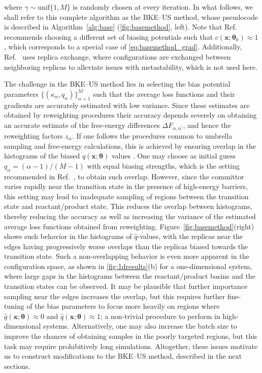 \documentclass{article}
\numberwithin{equation}{section}
\def\*#1{\mathbf{#1}}
\theoremstyle{definition}
\theoremstyle{remark}
\def\thetab{\boldsymbol{\theta}}
\begin{document}
where $\gamma \sim \mathrm{unif}\{1,M\}$ is randomly chosen at every iteration. 
In what follows, we shall refer to this complete algorithm as the BKE--US method, whose pseudocode is described in Algorithm~\ref{alg:base} (\cref{fig:basemethod}, left).
Note that Ref.~\cite{rotskoff2020learning} recommends choosing a different set of biasing potentials such that $ c ( \* x ; \thetab_{k} ) \approx 1 $, which corresponds to a special case of \cref{eq:basemethod_grad}. Additionally, Ref.~\cite{rotskoff2020learning} uses replica exchange, where configurations are exchanged between neighboring replicas to alleviate issues with metastability, which is not used here.

The challenge in the BKE--US method lies in selecting the bias potential parameters $\{ (\kappa_\alpha, q_\alpha) \}_{\alpha=1}^M$ such that the average loss functions and their gradients are  accurately estimated with low variance. 
Since these estimates are obtained by reweighting procedures their accuracy depends severely on obtaining an accurate estimate of the free-energy differences $ \Delta F_{\alpha, \alpha^\prime} $, and hence the reweighting factors $ z_{\alpha} $.
If one follows the procedures common to umbrella sampling and free-energy calculations, this is achieved by ensuring overlap in the histograms of the biased $\hat{q}(\* x; \thetab)$ values \cite{pohorille2010good}. 
One may choose as initial guess $q_\alpha = (\alpha - 1)/(M-1) $ with equal biasing strengths, which is the setting recommended in Ref.~\cite{rotskoff2020learning}, to obtain such overlap. However, since the committor varies rapidly near the transition state in the presence of high-energy barriers, this setting may lead to inadequate sampling of regions between the transition state and reactant/product state. 
This reduces the overlap between histograms, thereby reducing the accuracy as well as increasing the variance of the estimated average loss functions obtained from reweighting. 
Figure~\ref{fig:basemethod}(right) shows such behavior in the histograms of $\hat{q}$-values, with the replicas near the edges having progressively worse overlaps than the replicas biased towards the transition state. 
Such a non-overlapping behavior is even more apparent in the configuration space, as shown in \cref{fig:1dresults}(b) for a one-dimensional system, where large gaps in the histograms between the reactant/product basins and the transition states can be observed.
It may be plausible that further importance sampling near the edges increases the overlap, but this requires further fine-tuning of the bias parameters to focus more heavily on regions where $ \hat{q}(\* x ; \thetab ) \approx 0 $ and $ \hat{q}(\* x ; \thetab ) \approx 1 $; a non-trivial procedure to perform in high-dimensional systems. 
Alternatively, one may also increase the batch size to improve the chances of obtaining samples in the poorly targeted regions, but this task may require prohibitively long simulations.
Altogether, these issues motivate us to construct modifications to the BKE--US method, described in the next sections.
\end{document}
